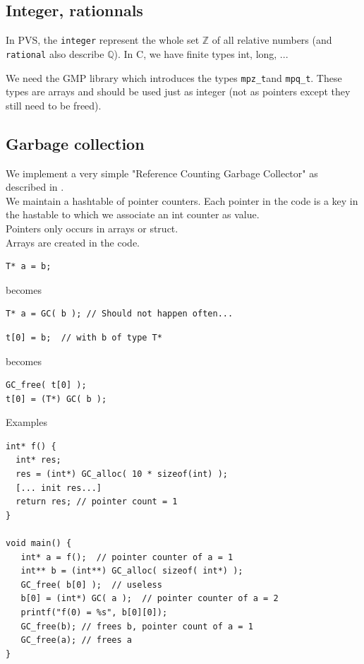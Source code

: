 \documentclass[12pt,a4paper,titlepage]{article}
\newcommand{\Z}{\mathbb{Z}}
\newcommand{\Q}{\mathbb{Q}}
\newcommand{\mpzt}{\texttt{mpz\_t}}
\newcommand{\mpqt}{\texttt{mpq\_t}}
\begin{document}
\subsection{Integer, rationnals}
In PVS, the \texttt{integer} represent the whole set $\Z$ of all relative numbers (and \texttt{rational} also describe $\Q$).
In C, we have finite types
int, long, ...

We need the GMP library which introduces the types \mpzt and \mpqt.
These types are arrays and should be used just as integer (not as pointers except they still need to be freed).


\subsection{Garbage collection }

We implement a very simple "Reference Counting Garbage Collector" as described in \cite{jonesgarbage}.\\

We maintain a hashtable of pointer counters.
Each pointer in the code is a key in the hastable to which we associate an int counter as value.\\

Pointers only occurs in arrays or struct.\\

Arrays are created in the code.\\


\begin{lstlisting}
T* a = b;
\end{lstlisting}
becomes
\begin{lstlisting}
T* a = GC( b ); // Should not happen often...
\end{lstlisting}

\begin{lstlisting}
t[0] = b;  // with b of type T*
\end{lstlisting}
becomes
\begin{lstlisting}
GC_free( t[0] );
t[0] = (T*) GC( b );
\end{lstlisting}

Examples

\begin{lstlisting}
int* f() {
  int* res;
  res = (int*) GC_alloc( 10 * sizeof(int) );
  [... init res...]
  return res; // pointer count = 1
}

void main() {
   int* a = f();  // pointer counter of a = 1
   int** b = (int**) GC_alloc( sizeof( int*) );
   GC_free( b[0] );  // useless
   b[0] = (int*) GC( a );  // pointer counter of a = 2
   printf("f(0) = %s", b[0][0]);
   GC_free(b); // frees b, pointer count of a = 1
   GC_free(a); // frees a
}
\end{lstlisting}
\end{document}
